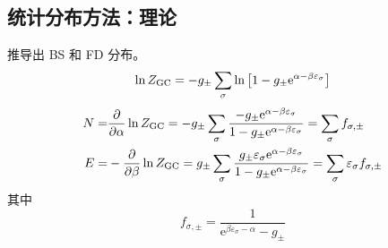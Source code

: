 \subsection{统计分布方法：理论}

\begin{framed}
推导出 BS 和 FD 分布。\[
\ln{Z_{\text{GC}}} = - g_{\pm} \sum_{\sigma} \ln \qty[1 - g_{\pm} \mathrm{e}^{\alpha - \beta \varepsilon_{\sigma}}]
\] \begin{align*}
    N = & \pdv{\alpha} \ln{Z_{\text{GC}}} = - g_{\pm} \sum_{\sigma} \frac{- g_{\pm} \mathrm{e}^{\alpha - \beta \varepsilon_{\sigma}}}{1 - g_{\pm} \mathrm{e}^{\alpha - \beta \varepsilon_{\sigma}}} = \sum_{\sigma} f_{\sigma, \pm}\\
    E = & - \pdv{\beta} \ln{Z_{\text{GC}}} = g_{\pm} \sum_{\sigma} \frac{g_{\pm} \varepsilon_{\sigma} \mathrm{e}^{\alpha - \beta \varepsilon_{\sigma}}}{1 - g_{\pm} \mathrm{e}^{\alpha - \beta \varepsilon_{\sigma}}} = \sum_{\sigma} \varepsilon_{\sigma} f_{\sigma, \pm}
\end{align*} 其中 \[
f_{\sigma, \pm} = \frac{1}{\mathrm{e}^{\beta \varepsilon_{\sigma} - \alpha} - g_{\pm} }
\]
\end{framed}

